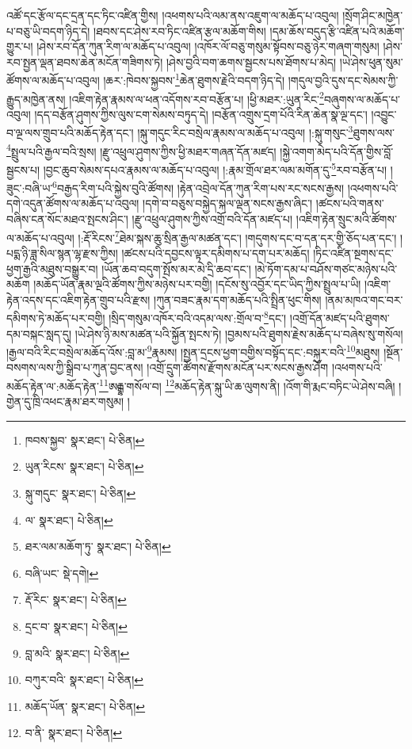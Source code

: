 འཚོ་དང་རྩོལ་དང་དྲན་དང་ཏིང་འཛིན་གྱིས། །འཕགས་པའི་ལམ་ནས་འཇུག་ལ་མཆོད་པ་འབུལ། །སྲོག་ཤིང་མཁྱེན་པ་བཅུ་ཡི་བདག་ཉིད་དེ། །ཐབས་དང་ཤེས་རབ་ཏིང་འཛིན་རྩལ་མཆོག་གིས། །དམ་ཆོས་བདུད་རྩི་འཛིན་པའི་མཆོག་གྱུར་པ། །ཤེས་རབ་དོན་ཀུན་རིག་ལ་མཆོད་པ་འབུལ། །འཁོར་ལོ་བཅུ་གསུམ་སྟོབས་བཅུ་ཉེར་གཞག་གསུམ། །ཤེས་རབ་སྤྱན་ལྡན་ཐབས་ཆེན་མངོན་གཟིགས་ཏེ། །ཤེས་བྱའི་བག་ཆགས་སྦྱངས་པས་ཐོགས་པ་མེད། །ཡེ་ཤེས་ཕུན་སུམ་ཚོགས་ལ་མཆོད་པ་འབུལ། །ཆར་:ཁེབས་སྐྱབས་\footnote{ཁབས་སྐྱབ་  སྣར་ཐང་།  པེ་ཅིན། }ཆེན་ཐུགས་རྗེའི་བདག་ཉིད་དེ། །གདུལ་བྱའི་དུས་དང་སེམས་ཀྱི་རྒྱུད་མཁྱེན་ནས། །འཇིག་རྟེན་རྣམས་ལ་ཕན་འདོགས་རབ་བརྩོན་པ། །ཕྱི་མཐར་:ཡུན་རིང་\footnote{ཡུན་རིངས་  སྣར་ཐང་།  པེ་ཅིན། }བཞུགས་ལ་མཆོད་པ་འབུལ། །དད་བརྩོན་ཤུགས་ཀྱིས་ལུས་ངག་སེམས་བཏུད་དེ། །བརྩོན་འགྲུས་དྲག་པོའི་རིན་ཆེན་སྣ་ལྔ་དང་། །འབྱུང་བ་ལྔ་ལས་གྲུབ་པའི་མཆོད་རྟེན་དང་། །སྐུ་གདུང་རིང་བསྲེལ་རྣམས་ལ་མཆོད་པ་འབུལ། །:སྐུ་གསུང་\footnote{སྐུ་གདུང་  སྣར་ཐང་།  པེ་ཅིན། }ཐུགས་ལས་\footnote{ལ་  སྣར་ཐང་།  པེ་ཅིན། }སྤྲུལ་པའི་རྒྱལ་བའི་སྲས། །རྫུ་འཕྲུལ་ཤུགས་ཀྱིས་ཕྱི་མཐར་གཞན་དོན་མཛད། །སྐྱེ་འགག་མེད་པའི་དོན་གྱིས་བློ་སྦྱངས་པ། །བྱང་ཆུབ་སེམས་དཔའ་རྣམས་ལ་མཆོད་པ་འབུལ། །:རྣམ་གྲོལ་ཐར་ལམ་མགོན་དུ་\footnote{ཐར་ལམ་མཆོག་ཏུ་  སྣར་ཐང་།  པེ་ཅིན། }རབ་བརྩོན་པ། །ཟུང་:བཞི་ཡ་\footnote{བཞི་ཡང་  སྡེ་དགེ། }བརྒྱད་རིག་པའི་སྐྱེས་བུའི་ཚོགས། །རྟེན་འབྲེལ་དོན་ཀུན་རིག་པས་རང་སངས་རྒྱས། །འཕགས་པའི་དགེ་འདུན་ཚོགས་ལ་མཆོད་པ་འབུལ། །དགེ་བ་བཅུས་བསྐྱེད་སྐལ་ལྡན་སངས་རྒྱས་ཞིང་། །ཚངས་པའི་གནས་བཞིས་ངན་སོང་མཐའ་སྤངས་ཤིང་། །རྫུ་འཕྲུལ་ཤུགས་ཀྱིས་འགྲོ་བའི་དོན་མཛད་པ། །འཇིག་རྟེན་སྲུང་མའི་ཚོགས་ལ་མཆོད་པ་འབུལ། །:རྡོ་རིངས་\footnote{རྡོ་རིང་  སྣར་ཐང་།  པེ་ཅིན། }ཐེམ་སྐས་ཆུ་སྲིན་རྒྱལ་མཚན་དང་། །གདུགས་དང་བ་དན་དར་གྱི་ཅོད་པན་དང་། །པདྨ་ཉི་ཟླ་སིལ་སྙན་ལྷ་རྫས་ཀྱིས། །ཚངས་པའི་དབྱངས་ལྟར་དམིགས་པ་དག་པར་མཆོད། །ཏིང་འཛིན་སྔགས་དང་ཕྱག་རྒྱའི་མཐུས་བསྒྱུར་བ། །ཡོན་ཆབ་བདུག་སྤོས་མར་མེ་དྲི་ཆབ་དང་། །མེ་ཏོག་དམ་པ་བཤོས་གཙང་མཉེས་པའི་མཆོག །མཆོད་ཡོན་རྣམ་ལྔའི་ཚོགས་ཀྱིས་མཉེས་པར་བགྱི། །དངོས་སུ་འབྱོར་དང་ཡིད་ཀྱིས་སྤྲུལ་པ་ཡི། །འཇིག་རྟེན་འདས་དང་འཇིག་རྟེན་གྲུབ་པའི་རྫས། །ཀུན་བཟང་རྣམ་དག་མཆོད་པའི་སྤྲིན་ཕུང་གིས། །ནམ་མཁའ་གང་བར་དམིགས་ཏེ་མཆོད་པར་བགྱི། །སྲིད་གསུམ་འཁོར་བའི་འདམ་ལས་:གྲོལ་བ་\footnote{དྲང་བ་  སྣར་ཐང་།  པེ་ཅིན། }དང་། །འགྲོ་དོན་མཛད་པའི་ཐུགས་དམ་བསྐང་སླད་དུ། །ཡེ་ཤེས་ཉི་མས་མཚན་པའི་སྐྱོན་སྤངས་ཏེ། །བྱམས་པའི་ཐུགས་རྗེས་མཆོད་པ་བཞེས་སུ་གསོལ། །རྒྱལ་བའི་རིང་བསྲེལ་མཆོད་འོས་:བླ་མ་\footnote{བླ་མའི་  སྣར་ཐང་།  པེ་ཅིན། }རྣམས། །སྤྱན་དྲངས་ཕྱག་བགྱིས་བསྟོད་དང་:བསྐུར་བའི་\footnote{བཀུར་བའི་  སྣར་ཐང་།  པེ་ཅིན། }མཐུས། །སྔོན་བསགས་ལས་ཀྱི་སྒྲིབ་པ་ཀུན་བྱང་ནས། །འགྲོ་དྲུག་ཚོགས་རྫོགས་མངོན་པར་སངས་རྒྱས་ཤོག །འཕགས་པའི་མཆོད་རྟེན་ལ་:མཆོད་རྟེན་\footnote{མཆོད་ཡོན་  སྣར་ཐང་།  པེ་ཅིན། }ཨརྒྷ་གསོལ་བ། \footnote{བ་ནི་  སྣར་ཐང་།  པེ་ཅིན། }མཆོད་རྟེན་སྐུ་ཡི་ཆ་ལུགས་ནི། །འོག་གི་རྨང་བཏིང་ཡེ་ཤེས་བཞི། །གྱེན་དུ་ཁྲི་འཕང་རྣམ་ཐར་གསུམ། །
